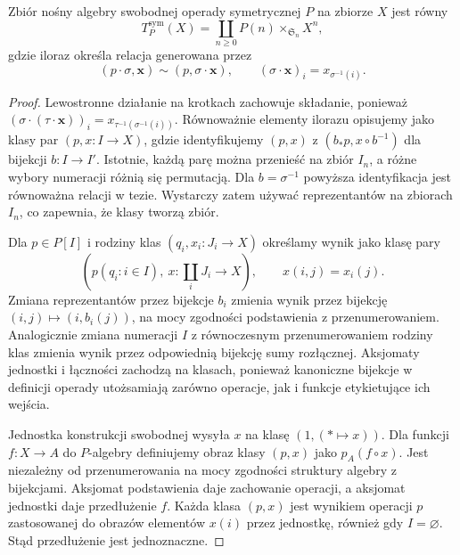 \begin{twierdzenie}\label{cat:thm:free-sym-operad-algebra}
Zbiór nośny algebry swobodnej operady symetrycznej $P$ na zbiorze $X$ jest równy
\[
 T_P^{\mathrm{sym}}(X)=\coprod_{n\geq0}P(n)\times_{\mathfrak S_n}X^n,
\]
gdzie iloraz określa relacja generowana przez
\[
 (p\cdot\sigma,\mathbf x)\sim(p,\sigma\cdot\mathbf x),
 \qquad (\sigma\cdot\mathbf x)_i=x_{\sigma^{-1}(i)}.
\]
\end{twierdzenie}
\begin{proof}
Lewostronne działanie na krotkach zachowuje składanie, ponieważ $(\sigma\cdot(\tau\cdot\mathbf x))_i=x_{\tau^{-1}(\sigma^{-1}(i))}$. Równoważnie elementy ilorazu opisujemy jako klasy par $(p,x:I\to X)$, gdzie identyfikujemy $(p,x)$ z $(b_*p,x\circ b^{-1})$ dla bijekcji $b:I\to I'$. Istotnie, każdą parę można przenieść na zbiór $I_n$, a różne wybory numeracji różnią się permutacją. Dla $b=\sigma^{-1}$ powyższa identyfikacja jest równoważna relacji w tezie. Wystarczy zatem używać reprezentantów na zbiorach $I_n$, co zapewnia, że klasy tworzą zbiór.

Dla $p\in P[I]$ i rodziny klas $(q_i,x_i:J_i\to X)$ określamy wynik jako klasę pary
\[
 \left(p(q_i:i\in I),\ x:\coprod_iJ_i\to X\right),
 \qquad x(i,j)=x_i(j).
\]
Zmiana reprezentantów przez bijekcje $b_i$ zmienia wynik przez bijekcję $(i,j)\mapsto(i,b_i(j))$, na mocy zgodności podstawienia z przenumerowaniem. Analogicznie zmiana numeracji $I$ z równoczesnym przenumerowaniem rodziny klas zmienia wynik przez odpowiednią bijekcję sumy rozłącznej. Aksjomaty jednostki i łączności zachodzą na klasach, ponieważ kanoniczne bijekcje w definicji operady utożsamiają zarówno operacje, jak i funkcje etykietujące ich wejścia.

Jednostka konstrukcji swobodnej wysyła $x$ na klasę $(1,(*\mapsto x))$. Dla funkcji $f:X\to A$ do $P$-algebry definiujemy obraz klasy $(p,x)$ jako $p_A(f\circ x)$. Jest niezależny od przenumerowania na mocy zgodności struktury algebry z bijekcjami. Aksjomat podstawienia daje zachowanie operacji, a aksjomat jednostki daje przedłużenie $f$. Każda klasa $(p,x)$ jest wynikiem operacji $p$ zastosowanej do obrazów elementów $x(i)$ przez jednostkę, również gdy $I=\varnothing$. Stąd przedłużenie jest jednoznaczne.
\end{proof}

